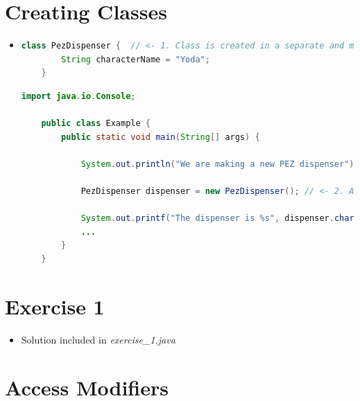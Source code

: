 \documentclass[12pt]{article}
\begin{document}
\bigskip

\section{Creating Classes}

\bigskip

\begin{itemize}
    \item

    \begin{lstlisting}[language=Java,caption={lesson\_3/PezDispenser.java}]
    class PezDispenser {  // <- 1. Class is created in a separate and matching file :)
        String characterName = "Yoda";
    }
    \end{lstlisting}

    \bigskip

    \begin{lstlisting}[language=Java,caption={lesson\_3/Example.java}]
    import java.io.Console;

    public class Example {
        public static void main(String[] args) {

            System.out.println("We are making a new PEZ dispenser");

            PezDispenser dispenser = new PezDispenser(); // <- 2. And is used here :)

            System.out.printf("The dispenser is %s", dispenser.characterName);
            ...
        }
    }
    \end{lstlisting}
\end{itemize}

\bigskip

\section{Exercise 1}

\bigskip

\begin{itemize}
    \item Solution included in \textit{exercise\_1.java}
\end{itemize}

\bigskip

\section{Access Modifiers}

\bigskip
\end{document}
